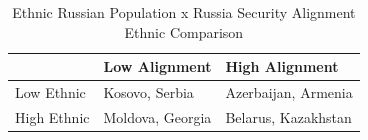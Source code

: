 \begin{table}[!t]
\caption*{
{\large Ethnic Russian Population x Russia Security Alignment} \\ 
{\small Ethnic Comparison}
} 
\fontsize{12.0pt}{14.4pt}\selectfont
\begin{tabular*}{\linewidth}{@{\extracolsep{\fill}}lll}
\toprule
 & Low Alignment & High Alignment \\ 
\midrule\addlinespace[2.5pt]
Low Ethnic & {Kosovo, Serbia} & {Azerbaijan, Armenia} \\ 
High Ethnic & {Moldova, Georgia} & {Belarus, Kazakhstan} \\ 
\bottomrule
\end{tabular*}
\end{table}

